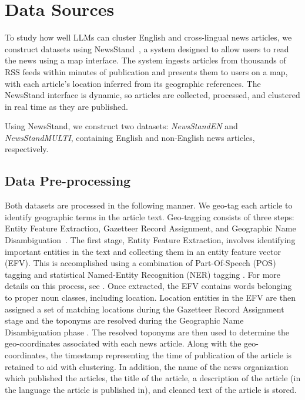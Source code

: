 \section{Data Sources}\label{section:data}

To study how well LLMs can cluster English and cross-lingual news articles, we construct datasets using NewsStand~\cite{Teit08}, a system designed to allow users to read the news using a map interface. 
The system ingests articles from thousands of RSS feeds within minutes of publication and presents them to users on a map, with each article's location inferred from its geographic references. 
The NewsStand interface is dynamic, so articles are collected, processed, and clustered in real time as they are published. 

Using NewsStand, we construct two datasets: \emph{NewsStandEN} and \emph{NewsStandMULTI}, containing English and non-English news articles, respectively.

\subsection{Data Pre-processing}
Both datasets are processed in the following manner.
We geo-tag each article to identify geographic terms in the article text.
Geo-tagging consists of three steps: Entity Feature Extraction, Gazetteer Record Assignment, and Geographic Name Disambiguation~\cite{Teit08}. 
The first stage, Entity Feature Extraction, involves identifying important entities in the text and collecting them in an entity feature vector (EFV). 
This is accomplished using a combination of Part-Of-Speech (POS) tagging and statistical Named-Entity Recognition (NER) tagging \cite{NER}. 
For more details on this process, see \cite{Same09d, Lieb07, Ho12}. 
Once extracted, the EFV contains words belonging to proper noun classes, including location. 
Location entities in the EFV are then assigned a set of matching locations during the Gazetteer Record Assignment stage and the toponyms are resolved during the Geographic Name Disambiguation phase \cite{Leid11, Lieb10b, Lieb11, Lieb12, Same14b, Schn21}.
The resolved toponyms are then used to determine the geo-coordinates associated with each news article.
Along with the geo-coordinates, the timestamp representing the time of publication of the article is retained to aid with clustering. In addition, the name of the news organization which published the articles, the title of the article, a description of the article (in the language the article is published in), and cleaned text of the article is stored.

